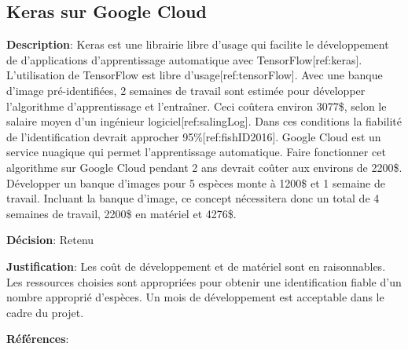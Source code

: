 

\subsection{Keras sur Google Cloud}
\label{s:identifier_conc4}

\textbf{Description}: Keras est une librairie libre d’usage qui facilite le développement de d’applications d’apprentissage automatique avec TensorFlow[ref:keras].  L’utilisation de TensorFlow est libre d’usage[ref:tensorFlow]. Avec une banque d’image pré-identifiées, 2 semaines de travail sont estimée pour développer l'algorithme d’apprentissage et l’entraîner. Ceci coûtera environ 3077\$, selon le salaire moyen d’un ingénieur logiciel[ref:salingLog]. Dans ces conditions la fiabilité de l’identification devrait approcher 95\%[ref:fishID2016]. Google Cloud est un service nuagique qui permet l’apprentissage automatique. Faire fonctionner cet algorithme sur Google Cloud pendant 2 ans devrait coûter aux environs de 2200\$. Développer un banque d’images pour 5 espèces monte à 1200\$ et 1 semaine de travail. Incluant la banque d’image, ce concept nécessitera donc un total de 4 semaines de travail, 2200\$ en matériel et 4276\$.

\textbf{Décision}: Retenu

\textbf{Justification}: Les coût de développement et de matériel sont en raisonnables. Les ressources choisies sont appropriées pour obtenir une identification fiable d’un nombre approprié d’espèces. Un mois de développement est acceptable dans le cadre du projet.

\textbf{Références}: 
\cite{keras, googCloud, tensorFlow, fishID_2016, sal_ingLog}